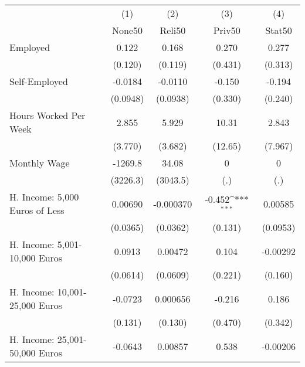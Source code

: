 {
\def\sym#1{\ifmmode^{#1}\else\(^{#1}\)\fi}
\begin{tabular}{l*{4}{c}}
\hline\hline
            &\multicolumn{1}{c}{(1)}&\multicolumn{1}{c}{(2)}&\multicolumn{1}{c}{(3)}&\multicolumn{1}{c}{(4)}\\
            &\multicolumn{1}{c}{None50}&\multicolumn{1}{c}{Reli50}&\multicolumn{1}{c}{Priv50}&\multicolumn{1}{c}{Stat50}\\
\hline
Employed    &       0.122         &       0.168         &       0.270         &       0.277         \\
            &     (0.120)         &     (0.119)         &     (0.431)         &     (0.313)         \\
[1em]
Self-Employed&     -0.0184         &     -0.0110         &      -0.150         &      -0.194         \\
            &    (0.0948)         &    (0.0938)         &     (0.330)         &     (0.240)         \\
[1em]
Hours Worked Per Week&       2.855         &       5.929         &       10.31         &       2.843         \\
            &     (3.770)         &     (3.682)         &     (12.65)         &     (7.967)         \\
[1em]
Monthly Wage&     -1269.8         &       34.08         &           0         &           0         \\
            &    (3226.3)         &    (3043.5)         &         (.)         &         (.)         \\
[1em]
H. Income: 5,000 Euros of Less&     0.00690         &   -0.000370         &      -0.452\sym{***}&     0.00585         \\
            &    (0.0365)         &    (0.0362)         &     (0.131)         &    (0.0953)         \\
[1em]
H. Income: 5,001-10,000 Euros&      0.0913         &     0.00472         &       0.104         &    -0.00292         \\
            &    (0.0614)         &    (0.0609)         &     (0.221)         &     (0.160)         \\
[1em]
H. Income: 10,001-25,000 Euros&     -0.0723         &    0.000656         &      -0.216         &       0.186         \\
            &     (0.131)         &     (0.130)         &     (0.470)         &     (0.342)         \\
[1em]
H. Income: 25,001-50,000 Euros&     -0.0643         &     0.00857         &       0.538         &    -0.00206         \\

\end{tabular}}
